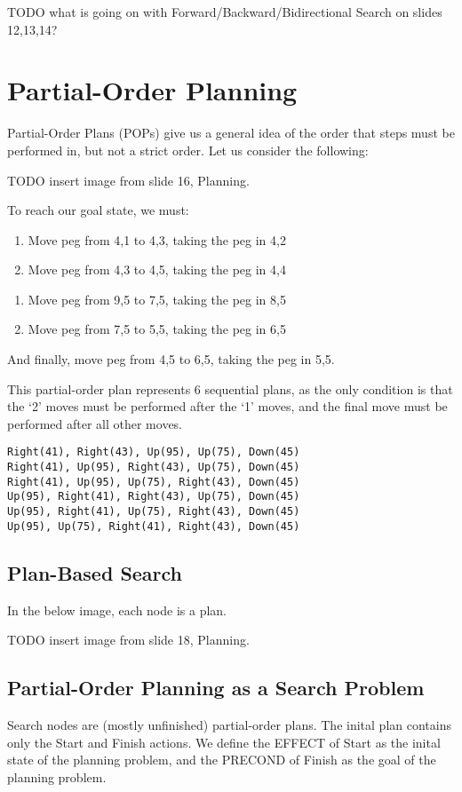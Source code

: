 TODO what is going on with Forward/Backward/Bidirectional Search on slides
12,13,14?

\section{Partial-Order Planning}
Partial-Order Plans (POPs) give us a general idea of the order that steps must be
performed in, but not a strict order. Let us consider the following:

TODO insert image from slide 16, Planning.

To reach our goal state, we must:
\begin{enumerate}
    \item Move peg from 4,1 to 4,3, taking the peg in 4,2
    \item Move peg from 4,3 to 4,5, taking the peg in 4,4
\end{enumerate}
\begin{enumerate}
    \item Move peg from 9,5 to 7,5, taking the peg in 8,5
    \item Move peg from 7,5 to 5,5, taking the peg in 6,5
\end{enumerate}
And finally, move peg from 4,5 to 6,5, taking the peg in 5,5.

This partial-order plan represents 6 sequential plans, as the only condition is
that the `2' moves must be performed after the `1' moves, and the final move
must be performed after all other moves.

\begin{lstlisting}
Right(41), Right(43), Up(95), Up(75), Down(45)
Right(41), Up(95), Right(43), Up(75), Down(45)
Right(41), Up(95), Up(75), Right(43), Down(45)
Up(95), Right(41), Right(43), Up(75), Down(45)
Up(95), Right(41), Up(75), Right(43), Down(45)
Up(95), Up(75), Right(41), Right(43), Down(45)
\end{lstlisting}

\subsection{Plan-Based Search}
In the below image, each node is a plan.

TODO insert image from slide 18, Planning.

\subsection{Partial-Order Planning as a Search Problem}
Search nodes are (mostly unfinished) partial-order plans. The inital plan
contains only the Start and Finish actions. We define the EFFECT of Start as
the inital state of the planning problem, and the PRECOND of Finish as the goal
of the planning problem.

